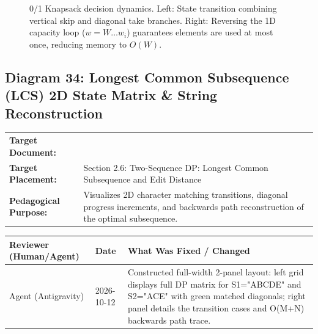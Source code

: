 \documentclass[11pt,a4paper]{article}
\newcommand{\breadcrumb}[3]{
    \par\vspace{0.15cm}
    \noindent\begin{tabularx}{\textwidth}{|l|X|}
    \hline
    \textbf{Target Document:} & \texttt{\detokenize{#1}} \\
    \textbf{Target Placement:} & #2 \\
    \textbf{Pedagogical Purpose:} & #3 \\
    \hline
    \end{tabularx}
    \vspace{0.15cm}\par
}
\newcommand{\diagramaudit}[3]{
    \par\vspace{0.12cm}
    \noindent\begin{tabularx}{\textwidth}{|l|l|>{\raggedright\arraybackslash}X|}
    \hline
    \textbf{Reviewer (Human/Agent)} & \textbf{Date} & \textbf{What Was Fixed / Changed} \\ \hline
    #1 & #2 & #3 \\ \hline
    \end{tabularx}
    \vspace{0.12cm}\par
}
\begin{document}
\begin{figure}[htbp]
{}
\caption{0/1 Knapsack decision dynamics. Left: State transition combining vertical skip and diagonal take branches. Right: Reversing the 1D capacity loop ($w = W \dots w_i$) guarantees elements are used at most once, reducing memory to $O(W)$.}
\end{figure}

\newpage
\newpage
\newpage

\subsection[Diagram 34: Longest Common Subsequence 2D Matrix]{Diagram 34: Longest Common Subsequence (LCS) 2D State Matrix \& String Reconstruction}

\breadcrumb{06.dynamic_programming.tex}{Section 2.6: Two-Sequence DP: Longest Common Subsequence and Edit Distance}{Visualizes 2D character matching transitions, diagonal progress increments, and backwards path reconstruction of the optimal subsequence.}

\diagramaudit{Agent (Antigravity)}{2026-10-12}{Constructed full-width 2-panel layout: left grid displays full DP matrix for S1="ABCDE" and S2="ACE" with green matched diagonals; right panel details the transition cases and O(M+N) backwards path trace.}
\end{document}
